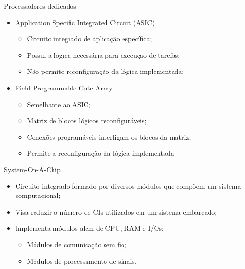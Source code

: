 \begin{frame}{Processadores dedicados}

    \begin{itemize}
        \item Application Specific Integrated Circuit (ASIC)
        \begin{itemize}
            \item Circuito integrado de aplicação específica;
            \item Possui a lógica necessária para execução de tarefas;
            \item Não permite reconfiguração da lógica implementada;
        \end{itemize}
        
        \item Field Programmable Gate Array
        
            \begin{itemize}
                \item Semelhante ao ASIC;
                \item Matriz de blocos lógicos reconfiguráveis;
                \item Conexões programáveis interligam os blocos da matriz;
                \item Permite a reconfiguração da lógica implementada;
            \end{itemize}
    \end{itemize}

\end{frame}


\begin{frame}{System-On-A-Chip}
    \begin{itemize}

    \item Circuito integrado formado por diversos módulos que compõem um sistema computacional;
    
    \item Visa reduzir o número de CIs utilizados em um sistema embarcado;
    
    \item Implementa módulos além de CPU, RAM e I/Os;
    
        \begin{itemize}
            \item Módulos de comunicação sem fio; 
            \item Módulos de processamento de sinais.
        \end{itemize}
    
    \end{itemize}
\end{frame}



